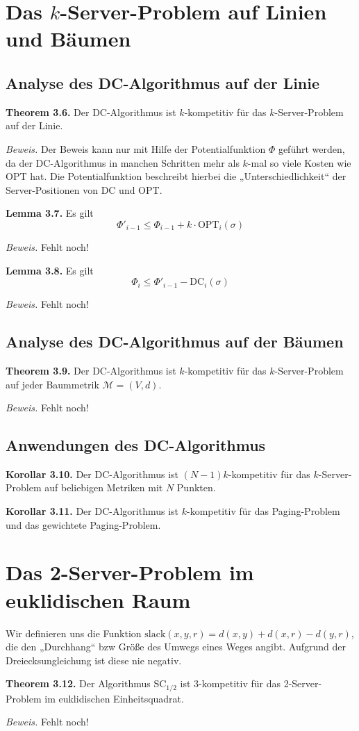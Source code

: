 \section{Das $k$-Server-Problem auf Linien und Bäumen}

\subsection{Analyse des DC-Algorithmus auf der Linie}

\textbf{Theorem 3.6.} Der DC-Algorithmus ist $k$-kompetitiv für das $k$-Server-Problem auf der Linie.

\textit{Beweis.} Der Beweis kann nur mit Hilfe der Potentialfunktion $\Phi$ geführt werden, da der DC-Algorithmus in manchen Schritten mehr als $k$-mal so viele Kosten wie OPT hat. Die Potentialfunktion beschreibt hierbei die „Unterschiedlichkeit“ der Server-Positionen von DC und OPT.

\textbf{Lemma 3.7.} Es gilt $$\Phi'_{i-1} \leq \Phi_{i-1} + k \cdot \textrm{OPT}_i(\sigma)$$

\textit{Beweis.} Fehlt noch!

\textbf{Lemma 3.8.} Es gilt $$\Phi_{i} \leq \Phi'_{i-1} - \textrm{DC}_i(\sigma)$$

\textit{Beweis.} Fehlt noch!


\subsection{Analyse des DC-Algorithmus auf der Bäumen}

\textbf{Theorem 3.9.} Der DC-Algorithmus ist $k$-kompetitiv für das $k$-Server-Problem auf jeder Baummetrik $\mathcal{M} = (V,d)$.

\textit{Beweis.} Fehlt noch!

\subsection{Anwendungen des DC-Algorithmus}

\textbf{Korollar 3.10.} Der DC-Algorithmus ist $(N-1)k$-kompetitiv für das $k$-Server-Problem auf beliebigen Metriken mit $N$ Punkten.

\textbf{Korollar 3.11.} Der DC-Algorithmus ist $k$-kompetitiv für das Paging-Problem und das gewichtete Paging-Problem.

\section{Das 2-Server-Problem im euklidischen Raum}

Wir definieren uns die Funktion $\textrm{slack}(x,y,r) = d(x,y)+d(x,r)-d(y,r)$, die den „Durchhang“ bzw Größe des Umwegs eines Weges angibt. Aufgrund der Dreiecksungleichung ist diese nie negativ.

\textbf{Theorem 3.12.} Der Algorithmus $\textrm{SC}_{1/2}$ ist 3-kompetitiv für das 2-Server-Problem im euklidischen Einheitsquadrat.

\textit{Beweis.} Fehlt noch!
